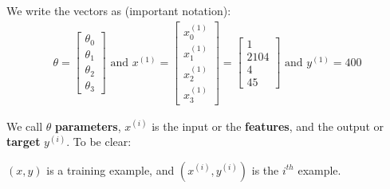 \documentclass[12pt,a4paper]{report}
\begin{document}
We write the vectors as (important notation):
\begin{align*}
    \theta = \begin{bmatrix}
        \theta_0 \\ \theta_1 \\ \theta_2 \\ \theta_3 
    \end{bmatrix} \text{ and } 
    x^{(1)} = \begin{bmatrix}
        x_0^{(1)} \\ x_1^{(1)} \\ x_2^{(1)} \\ x_3^{(1)} 
    \end{bmatrix} 
            = \begin{bmatrix}
            1 \\ 2104 \\ 4 \\ 45
    \end{bmatrix} \text{ and } y^{(1)} = 400
\end{align*}


We call $\theta$ \textbf{parameters}, $x^{(i)}$ is the input or the \textbf{features}, and the output or \textbf{target} $y^{(i)}$. To be clear:

$(x, y)$ is a training example, and $(x^{(i)}, y^{(i)})$ is the $i^{th}$ example.
\end{document}
